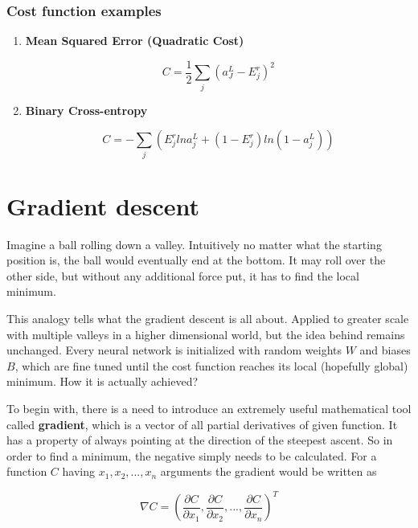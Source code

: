 \subsubsection*{Cost function examples}
\label{sub2:cost-function-examples}

\begin{enumerate}
    \item \textbf{Mean Squared Error (Quadratic Cost)}
    
    \begin{equation}
        C = \frac{1}{2}\sum_j (a^L_J - E^r_j)^2
    \end{equation}
    
    \item \textbf{Binary Cross-entropy}
    
    \begin{equation}
        C = -\sum_j\left(E_j^rlna_j^L + (1-E_j^r) ln(1 - a_j^L)\right)
    \end{equation}
    
\end{enumerate}

\section{Gradient descent}
\label{sec:gradient-descent}

Imagine a ball rolling down a valley. Intuitively no matter what the starting position is, the ball would eventually end at the bottom. It may roll over the other side, but without any additional force put, it has to find the local minimum. 

This analogy tells what the gradient descent is all about. Applied to greater scale with multiple valleys in a higher dimensional world, but the idea behind remains unchanged. Every neural network is initialized with random weights $W$ and biases $B$, which are fine tuned until the cost function reaches its local (hopefully global) minimum. How it is actually achieved?

To begin with, there is a need to introduce an extremely useful mathematical tool called \textbf{gradient}, which is a vector of all partial derivatives of given function. It has a property of always pointing at the direction of the steepest ascent. So in order to find a minimum, the negative simply needs to be calculated. For a function $C$ having $x_1, x_2, ..., x_n$ arguments the gradient would be written as 

\begin{equation}
    \nabla C = \left(\frac{\partial C}{\partial x_1}, \frac{\partial C}{\partial x_2}, ..., \frac{\partial C}{\partial x_n}\right)^T
\end{equation}


